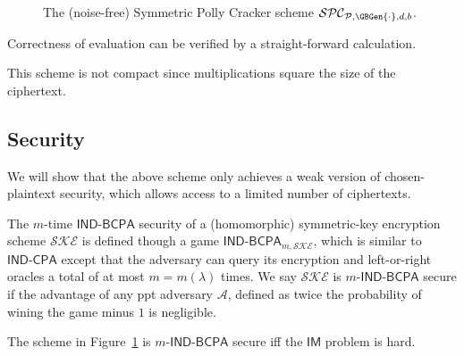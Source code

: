 \documentclass[draft]{llncs}
\newcommand{\SPC}{\ensuremath{\mathcal{SPC}}\xspace}
\newcommand{\IM}{\ensuremath{\mathsf{IM}}\xspace}
\newcommand{\SKE}{\ensuremath{\mathcal{SKE}}\xspace}
\newcommand{\secpar}{\lambda}
\newcommand{\Eval}{\mathsf{Eval}}
\newcommand{\PK}{\mathsf{PK}}
\newcommand{\Circt}{C}
\newcommand{\A}{\ensuremath{\mathcal{A}}\xspace}
\newcommand{\IND}{\mathsf{IND}}
\newcommand{\CPA}{\mathsf{CPA}}
\newcommand{\INDCPA}{\ensuremath{\IND\mbox{-}\CPA}\xspace}
\newcommand{\BCPA}{\mathsf{BCPA}}
\newcommand{\px}{\phantom{i}}
\begin{document}
\begin{figure}[ht]
{
}
\caption{The (noise-free) Symmetric Polly Cracker scheme $\SPC_{\mathcal{P},\GBGen{\cdot},d,b}$.}
\label{fig.spc}
\vspace{-6mm} \end{figure}

Correctness of evaluation can be verified by a straight-forward calculation.

This scheme is not compact since multiplications square the size of the ciphertext.

\vspace{-3mm} \subsection{Security} \vspace{-2mm}
We will show that the above scheme only achieves a weak version of chosen-plaintext security, which allows access to a limited number of ciphertexts.
\begin{definition}
The $m$-time $\IND\mbox{-}\BCPA$ security of a (homomorphic) symmetric-key encryption scheme $\SKE$ is defined though a game $\IND\mbox{-}\BCPA_{m,\SKE}$, which is similar to \INDCPA except that the adversary can query its encryption and left-or-right oracles a total of at most $m=m(\secpar)$ times. We say $\SKE$ is $m\mbox{-}\IND\mbox{-}\BCPA$ secure if the advantage of any ppt adversary $\A$, defined as twice the probability of wining the game minus $1$ is negligible.  
 \end{definition}

\begin{theorem}
\label{thm:spc}
The scheme in Figure~\ref{fig.spc} is $m\mbox{-}\IND\mbox{-}\BCPA$ secure iff the \IM problem is hard.
\end{theorem}
\end{document}
